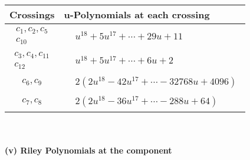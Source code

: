 \documentclass[1p]{elsarticle_modified}
\theoremstyle{definition}
\begin{document}
\begin{tabular}{m{50pt}|m{274pt}}
Crossings & \hspace{64pt}u-Polynomials at each crossing \\
\hline $$\begin{aligned}c_{1},c_{2},c_{5}\\c_{10}\end{aligned}$$&$\begin{aligned}
&u^{18}+5 u^{17}+\cdots+29 u+11
\end{aligned}$\\
\hline $$\begin{aligned}c_{3},c_{4},c_{11}\\c_{12}\end{aligned}$$&$\begin{aligned}
&u^{18}+5 u^{17}+\cdots+6 u+2
\end{aligned}$\\
\hline $$\begin{aligned}c_{6},c_{9}\end{aligned}$$&$\begin{aligned}
&2(2 u^{18}-42 u^{17}+\cdots-32768 u+4096)
\end{aligned}$\\
\hline $$\begin{aligned}c_{7},c_{8}\end{aligned}$$&$\begin{aligned}
&2(2 u^{18}-36 u^{17}+\cdots-288 u+64)
\end{aligned}$\\
\hline
\end{tabular}\\~\\
\newpage\renewcommand{\arraystretch}{1}
\flushleft \textbf{(v) Riley Polynomials at the component}\newline \\
\end{document}
